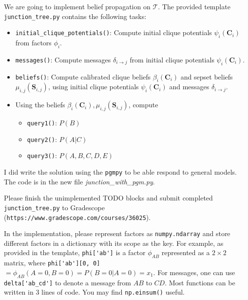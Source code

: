 \documentclass[12pt]{article} \usepackage[utf8]{inputenc}
\newcommand{\Tcal}{\mathcal{T}}
\newcommand{\Cbs}{\boldsymbol{C}}
\newcommand{\Sbs}{\boldsymbol{S}}
\begin{document}
We are going to implement belief propagation on $ \Tcal $.
The provided template \verb|junction_tree.py| contains the following tasks:


\begin{itemize}
\item \verb|initial_clique_potentials()|: Compute  initial clique potentials $ \psi_i (\Cbs_i) $ from factors $ \phi_i  $. 

\item \verb|messages()|: Compute messages $ \delta_{i \to j}  $ from initial clique potentials $ \psi_i (\Cbs_i)  $.

\item \verb|beliefs()|: Compute calibrated clique beliefs $ \beta_i(\Cbs_i) $ and sepset beliefs $ \mu_{i,j} (\Sbs_{i,j})  $, using initial clique potentials $ \psi_i (\Cbs_i) $ and messages $ \delta_{i \to j}  $. 

\item Using the beliefs $ \beta_i(\Cbs_i), \mu_{i,j} (\Sbs_{i,j}) $, compute 
\begin{itemize}
\item \verb|query1()|: $ P(B) $
\item \verb|query2()|: $ P(A | C) $
\item \verb|query3()|: $ P(A, B, C, D, E) $
\end{itemize}

\end{itemize}

\begin{solution}
  I did write the solution using the \texttt{pgmpy} to be able respond
  to general models. The code is in the new file
  \emph{junction\_with\_pgm.py}.
\end{solution}
Please finish the unimplemented TODO blocks and submit completed \verb|junction_tree.py| to Gradescope (\verb|https://www.gradescope.com/courses/36025|). 


In the implementation, please represent factors as \verb|numpy.ndarray| and store different factors in a dictionary with its scope as the key.
For example, as provided in the template, \verb|phi['ab']| is a factor $ \phi_{AB} $ represented as a $ 2 \times 2 $ matrix, where \verb|phi['ab'][0, 0]| $ = \phi_{AB} (A = 0, B = 0) =  P(B= 0 | A = 0)  = x_1 $.
For messages, one can use \verb|delta['ab_cd']| to denote a message from $ AB $ to $ CD $.
Most functions can be written in 3 lines of code. 
You may find \verb|np.einsum()| useful.

\newpage
\end{document}
